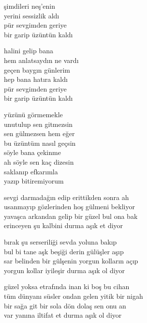 \documentclass[10pt, openright, oneside]{memoir}
\theoremstyle{definition}
\begin{document}
\vspace*{\fill}
%
\newpage
{}
\vspace*{\fill}
\settowidth{\versewidth}{hem anlatsaydın ne vardı}
\begin{cverse}
  şimdileri neş'enin \\
  yerini sessizlik aldı \\
  pür sevgimden geriye \\
  bir garip üzüntün kaldı

  halini gelip bana \\
  hem anlatsaydın ne vardı \\
  geçen baygın günlerim \\
  hep bana hatıra kaldı \\
  pür sevgimden geriye \\
  bir garip üzüntün kaldı

  yüzünü görmemekle \\
  unutulup sen gitmezsin \\
  sen gülmezsen hem eğer \\
  bu üzüntüm nasıl geçsin \\
  söyle bana çekinme \\
  ah söyle sen kaç dizesin \\
  saklanıp efkarımla \\
  yazıp bitiremiyorum
\end{cverse}
\vspace*{\fill}
%
\newpage
{}
\vspace*{\fill}
\settowidth{\versewidth}{sar belinden bir gülşenin yorgun kolların açıp}
\begin{cverse}
  sevgi darmadağın edip erittikden sonra ah \\
  usanmayıp gözlerinden hoş gülmeni bekliyor \\
  yavaşca arkandan gelip bir güzel bul ona bak \\
  erinceyen şu kalbini durma aşık et diyor

  bırak şu serseriliği sevda yoluna bakıp \\
  bul bi tane aşk beşiği derin gülüşler aşıp \\
  sar belinden bir gülşenin yorgun kolların açıp \\
  yorgun kollar iyileşir durma aşık ol diyor

  güzel yoksa etrafında inan ki boş bu cihan \\
  tüm dünyanı süsler ondan gelen yitik bir nigah \\
  bir sağa git bir sola dön dolaş sen onu an \\
  var yanına iltifat et durma aşık ol diyor
\end{cverse}
\end{document}
